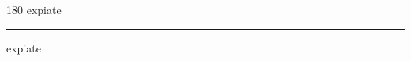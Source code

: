 
\begin{frame}
\begin{center}
\begin{turn}{180}
{\fontsize{2.5cm}{1em}\selectfont expiate}
\end{turn}
\vspace{1em}\par  
\hrule
\vspace{1em}\par  
{\fontsize{2.5cm}{1em}\selectfont expiate}
\end{center}
\end{frame}
